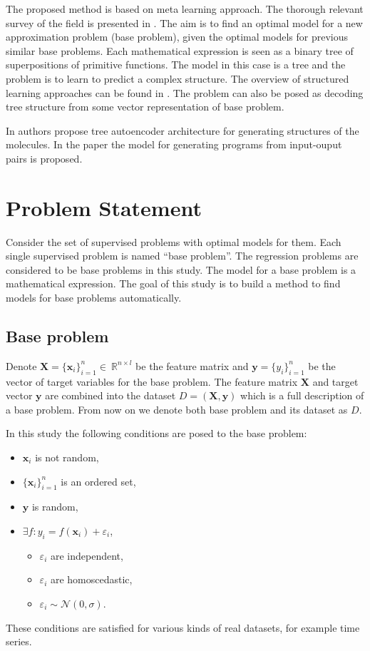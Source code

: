 \documentclass[12pt]{article}
\begin{document}
The proposed method is based on meta learning approach.
The thorough relevant survey of the field is presented in \cite{lemke2015metalearning, brazdil2018metalearning}.
The aim is to find an optimal model for a new approximation problem (base problem), given the optimal models for previous similar base problems.
Each mathematical expression is seen as a binary tree of superpositions of primitive functions.
The model in this case is a tree and the problem is to learn to predict a complex structure.
The overview of structured learning approaches can be found in \cite{nowozin2011structured}.
The problem can also be posed as decoding tree structure from some vector representation of base problem.

In \cite{jin2018junction} authors propose tree autoencoder architecture for generating structures of the molecules. In the paper \cite{parisotto2016neuro} the model for generating programs from input-ouput pairs is proposed.


\newpage

\section{Problem Statement}
Consider the set of supervised problems with optimal models for them.
Each single supervised problem is named ``base problem''.
The regression problems are considered to be base problems in this study.
The model for a base problem is a mathematical expression.
The goal of this study is to build a method to find models for base problems automatically.

\subsection{Base problem}
\label{base}
Denote $\mathbf{X} = \{\mathbf{x}_i\}_{i=1}^n \in~\mathbb{R}^{n \times l}$ be the feature matrix and $\mathbf{y} = \{y_i\}_{i=1}^n$ be the vector of target variables for the base problem.
The feature matrix $\mathbf{X}$ and target vector $\mathbf{y}$ are combined into the dataset $D = (\mathbf{X}, \mathbf{y})$ which is a full description of a base problem.
From now on we denote both base problem and its dataset as $D$.

In this study the following conditions are posed to the base problem:
\begin{itemize}
	\item $\mathbf{x}_i$ is not random,
  \item $\{\mathbf{x}_i\}_{i=1}^n$ is an ordered set,
  \item $\mathbf{y}$ is random,
	\item $\exists f: y_i = f(\mathbf{x}_i) + \varepsilon_i$,
  \begin{itemize}
    \item $\varepsilon_i$ are independent,
    \item $\varepsilon_i$ are homoscedastic,
    \item $\varepsilon_i \sim \mathcal{N}(0, \sigma)$.
  \end{itemize}
\end{itemize}
These conditions are satisfied for various kinds of real datasets, for example time series.
\end{document}
